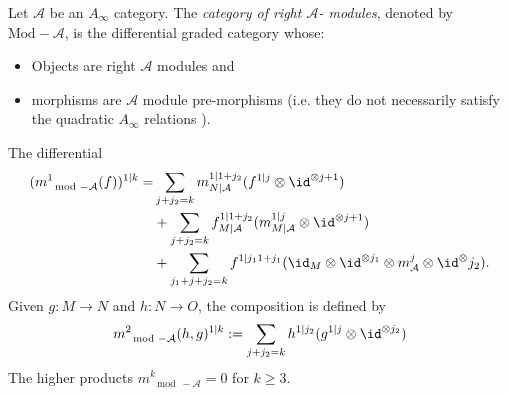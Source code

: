 
 
 
Let $\mathcal A$ be  an \emph{$A_\infty$} category. The \emph{category of right $\mathcal A$- modules}, denoted by $\text{Mod}-\mathcal A$, is the differential graded category whose: 
\begin{itemize}
    \item Objects are right $\mathcal A$ modules and
    \item morphisms are $\mathcal A$ module pre-morphisms (i.e. they do not necessarily satisfy the quadratic $A_\infty$ relations ).
\end{itemize}
The differential 
\begin{align*}
    (m^1_{\mod-\mathcal A}(f))^{1|k}=& \sum_{j+j_2=k} m^{1| 1+j_2}_{N|\mathcal A}(f^{1|j}\otimes \id^{\otimes j+1})\\&+  \sum_{j+j_2=k} f^{1| 1+j_2}_{M|\mathcal A}(m^{1|j}_{M|\mathcal A}\otimes \id^{\otimes j+1})\\&+ \sum_{j_1+j+j_2=k}f^{1|j_1 1+j_1}(\id_M\otimes \id^{\otimes j_1}\otimes m^j_{\mathcal A}\otimes \id^\otimes{j_2}).
\end{align*}
Given $g:M\to N$ and $h: N\to O$, the composition is defined by 
\[m^2_{\mod-\mathcal A}(h, g)^{1|k}:=\sum_{j+j_2=k}h^{1|j_2}(g^{1|j}\otimes \id^{\otimes j_2})\]
The higher products $m^k_{\mod-\mathcal A}=0$ for $k\geq 3$. 
 